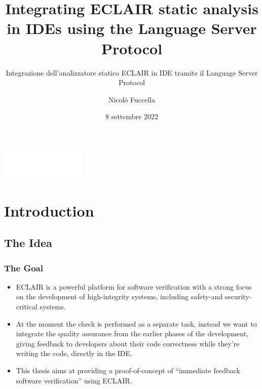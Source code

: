 \documentclass[compress,xcolor={dvipsnames}]{beamer}
\title{Integrating ECLAIR static analysis in IDEs using the Language Server Protocol}
\subtitle{Integrazione dell’analizzatore statico ECLAIR in IDE tramite il Language Server Protocol}
\author{Nicolò Fuccella}
\date{8 settembre 2022}
\newenvironment{emphcolor}
               {\usebeamercolor[fg]{title}}
               {\usebeamercolor[fg]{text}}
\begin{document}
\begin{frame}
  \centering

  {\color{green}
  \includegraphics[height=4em]{logo_unipr_w}
  \vspace{.5em}
  }

  \inserttitle

  \insertsubtitle

  \vfill
  \insertauthor

  \vfill
  \insertdate
\end{frame}

\section{Introduction}

\subsection{The Idea}

\begin{frame}
  \frametitle{The Goal}

  \begin{itemize}
   \setlength\itemsep{2em}
    \item
      ECLAIR is a powerful platform for software verification with a strong focus on the development of high-integrity systems, 
      including safety-and security-critical systems.

    \item
      At the moment the check is performed as a separate task, 
      instead we want to integrate the quality assurance from the earlier phases of the development,
      giving feedback to developers about their code correctness while they're writing the code, 
      directly in the IDE.

    \item
      \begin{emphcolor}
        This thesis aims at providing a proof-of-concept of ``immediate feedback software verification'' using ECLAIR.  
      \end{emphcolor}
  \end{itemize}
\end{frame}
\end{document}
